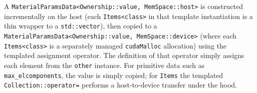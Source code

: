 \begin{Shaded}
\begin{Highlighting}[]
\NormalTok{\{}
\NormalTok{\};}

\NormalTok{\{}
\NormalTok{\};}

\NormalTok{\{}
\NormalTok{\};}

\NormalTok{\{}
    \NormalTok{\textless{}}

     

\NormalTok{=(}
\NormalTok{\};}
\end{Highlighting}
\end{Shaded}

A
\texttt{MaterialParamsData\textless{}Ownership::value,\ MemSpace::host\textgreater{}}
is constructed incrementally on the host (each
\texttt{Items\textless{}class\textgreater{}} in that template
instantiation is a thin wrapper to a \texttt{std::vector}), then copied
to a
\texttt{MaterialParamsData\textless{}Ownership::value,\ MemSpace::device\textgreater{}}
(where each \texttt{Items\textless{}class\textgreater{}} is a separately
managed \texttt{cudaMalloc} allocation) using the templated assignment
operator. The definition of that operator simply assigns each element
from the \texttt{other} instance. For primitive data such as
\texttt{max\_elcomponents}, the value is simply copied; for
\texttt{Items} the templated \texttt{Collection::operator=} performs a
host-to-device transfer under the hood.

